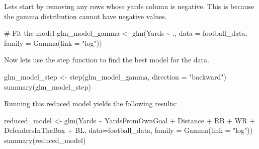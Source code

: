 \documentclass[
  super,
  preprint,
  3p]{elsarticle}
\newenvironment{Shaded}{\begin{snugshade}}{\end{snugshade}}
\newcommand{\AttributeTok}[1]{\textcolor[rgb]{0.40,0.45,0.13}{#1}}
\newcommand{\CommentTok}[1]{\textcolor[rgb]{0.37,0.37,0.37}{#1}}
\newcommand{\DecValTok}[1]{\textcolor[rgb]{0.68,0.00,0.00}{#1}}
\newcommand{\FloatTok}[1]{\textcolor[rgb]{0.68,0.00,0.00}{#1}}
\newcommand{\FunctionTok}[1]{\textcolor[rgb]{0.28,0.35,0.67}{#1}}
\newcommand{\NormalTok}[1]{\textcolor[rgb]{0.00,0.23,0.31}{#1}}
\newcommand{\OtherTok}[1]{\textcolor[rgb]{0.00,0.23,0.31}{#1}}
\newcommand{\SpecialCharTok}[1]{\textcolor[rgb]{0.37,0.37,0.37}{#1}}
\newcommand{\StringTok}[1]{\textcolor[rgb]{0.13,0.47,0.30}{#1}}
\begin{document}
Lets start by removing any rows whose yards column is negative. This is
because the gamma distribution cannot have negative values.

\begin{Shaded}
\end{Shaded}

\begin{Shaded}
\begin{Highlighting}[]
\CommentTok{\# Fit the model}
\NormalTok{glm\_model\_gamma }\OtherTok{\textless{}{-}} \FunctionTok{glm}\NormalTok{(Yards }\SpecialCharTok{\textasciitilde{}}\NormalTok{ ., }\AttributeTok{data =}\NormalTok{ football\_data, }\AttributeTok{family =} \FunctionTok{Gamma}\NormalTok{(}\AttributeTok{link =} \StringTok{"log"}\NormalTok{))}
\end{Highlighting}
\end{Shaded}

Now lets use the step function to find the best model for the data.

\begin{Shaded}
\begin{Highlighting}[]
\NormalTok{glm\_model\_step }\OtherTok{\textless{}{-}} \FunctionTok{step}\NormalTok{(glm\_model\_gamma, }\AttributeTok{direction =} \StringTok{"backward"}\NormalTok{)}
\FunctionTok{summary}\NormalTok{(glm\_model\_step)}
\end{Highlighting}
\end{Shaded}

Running this reduced model yields the following results:

\begin{Shaded}
\begin{Highlighting}[]
\NormalTok{reduced\_model }\OtherTok{\textless{}{-}} \FunctionTok{glm}\NormalTok{(Yards }\SpecialCharTok{\textasciitilde{}}\NormalTok{ YardsFromOwnGoal }\SpecialCharTok{+}\NormalTok{ Distance }\SpecialCharTok{+}\NormalTok{ RB }\SpecialCharTok{+}\NormalTok{ WR }\SpecialCharTok{+}\NormalTok{ DefendersInTheBox }\SpecialCharTok{+}\NormalTok{ BL, }\AttributeTok{data=}\NormalTok{football\_data, }\AttributeTok{family =} \FunctionTok{Gamma}\NormalTok{(}\AttributeTok{link =} \StringTok{"log"}\NormalTok{))}
\FunctionTok{summary}\NormalTok{(reduced\_model)}
\end{Highlighting}
\end{Shaded}
\end{document}
